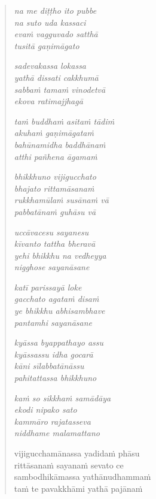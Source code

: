 

\cleartoverso

\vspace*{30mm}

\begin{verse}

\emph{na me diṭṭho ito pubbe}\\
\emph{na suto uda kassaci}\\
\emph{evaṁ vagguvado satthā}\\
\emph{tusitā gaṇimāgato}

\emph{sadevakassa lokassa\\
yathā dissati cakkhumā}\\
\emph{sabbaṁ tamaṁ vinodetvā\\
ekova ratimajjhagā}

\emph{taṁ buddhaṁ asitaṁ tādiṁ\\
akuhaṁ gaṇimāgataṁ}\\
\emph{bahūnamidha baddhānaṁ\\
atthi pañhena āgamaṁ}

\emph{bhikkhuno vijigucchato\\
bhajato rittamāsanaṁ}\\
\emph{rukkhamūlaṁ susānaṁ vā\\
pabbatānaṁ guhāsu vā}

\emph{uccāvacesu sayanesu\\
kīvanto tattha bheravā}\\
\emph{yehi bhikkhu na vedheyya\\
nigghose sayanāsane}

\emph{katī parissayā loke\\
gacchato agataṁ disaṁ}\\
\emph{ye bhikkhu abhisambhave\\
pantamhi sayanāsane}

\emph{kyāssa byappathayo assu\\
kyāssassu idha gocarā}\\
\emph{kāni sīlabbatānāssu\\
pahitattassa bhikkhuno}

\emph{kaṁ so sikkhaṁ samādāya\\
ekodi nipako sato}\\
\emph{kammāro rajatasseva\\
niddhame malamattano}

vijigucchamānassa yadidaṁ phāsu\\
rittāsanaṁ sayanaṁ sevato ce\\
sambodhikāmassa yathānudhammaṁ\\
taṁ te pavakkhāmi yathā pajānaṁ


\end{verse}
